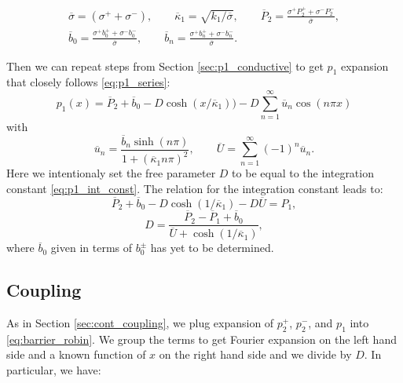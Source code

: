 \documentclass[sn-mathphys,Numbered]{sn-jnl}
\def\ol#1{\overline{#1}}
\begin{document}
\begin{gather*}
    \ol{\sigma} = (\sigma^+ + \sigma^-), \qquad
    \ol{\kappa}_1 = \sqrt{k_1/\ol{\sigma}}, \qquad
    \ol{P}_2 = \frac{\sigma^+ P_2^+ + \sigma^- P_2^-}{\ol{\sigma}}, \\
%    
    \ol{b}_0 = \frac{\sigma^+ b_0^+ + \sigma^- b_0^-}{\ol{\sigma}}, \qquad
    \ol{b}_n = \frac{\sigma^+ b_n^+ + \sigma^- b_n^-}{\ol{\sigma}}.  
\end{gather*}

Then we can repeat steps from Section \ref{sec:p1_conductive} to get $p_1$ expansion that closely follows \eqref{eq:p1_series}:
\begin{equation}
    \label{eq:barrier_p1_series}
    p_1(x) = \ol{P}_2 +  \ol{b}_0 - D\cosh(x/\ol{\kappa}_1)\big) - D \sum_{n=1}^\infty  \ol{u}_n \cos(n \pi x) 
\end{equation}
with 
\begin{equation}
    \label{eq:barrier_un}
    \ol{u}_n = \frac{\ol{b}_n \sinh(n \pi)}{1 + (\ol{\kappa}_1 n \pi)^2}, \qquad
    \ol{U} =  \sum_{n=1}^{\infty} (-1)^n \ol{u}_n.
\end{equation}
Here we intentionaly set the free parameter $D$ to be equal to the integration constant \eqref{eq:p1_int_const}. The relation for the integration constant leads to:
\[
    \label{eq:barrier_D_eq}    
    \ol{P}_2 + \ol{b}_0 -D\cosh(1/\ol{\kappa}_1) - D \ol{U} = P_1,
\]
\begin{equation}
    \label{eq:barrier_D_expr}    
    D = \frac{\ol{P}_2- \ol{P}_1 + \ol{b}_0}{\ol{U} +\cosh(1/\ol{\kappa}_1)},
\end{equation}
where $\ol{b}_0$ given in terms of $b_0^{\pm}$ has yet to be determined.

\subsection{Coupling}
\label{sec:barrier_coupling}
As in Section \ref{sec:cont_coupling}, we plug expansion of $p_2^+$, $p_2^-$, and $p_1$ into \eqref{eq:barrier_robin}. 
We group the terms to get Fourier expansion on the left hand side and a known function of $x$ on the right hand side and we divide by $D$.
In particular, we have:
% 
\end{document}

